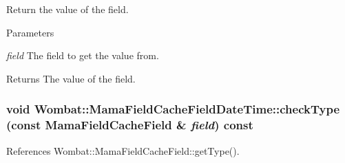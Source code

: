 Return the value of the field. 
\begin{DoxyParams}{Parameters}
\item[{\em field}]The field to get the value from. \end{DoxyParams}
\begin{DoxyReturn}{Returns}
The value of the field. 
\end{DoxyReturn}
\hypertarget{classWombat_1_1MamaFieldCacheFieldDateTime_aee09574007906cf57ffed278b4effe1f}{
\subsubsection[{checkType}]{\setlength{\rightskip}{0pt plus 5cm}void Wombat::MamaFieldCacheFieldDateTime::checkType (const {\bf MamaFieldCacheField} \& {\em field}) const}}
\label{classWombat_1_1MamaFieldCacheFieldDateTime_aee09574007906cf57ffed278b4effe1f}


References Wombat::MamaFieldCacheField::getType().